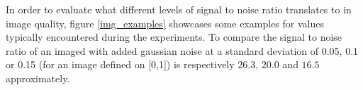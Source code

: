 \documentclass{article}
\begin{document}
In order to evaluate what different levels of signal to noise ratio 
translates to in image quality, figure \ref{img_examples} showcases some 
examples for values typically encountered during the experiments. To 
compare the signal to noise ratio of an imaged with added gaussian noise 
at a standard deviation of 0.05, 0.1 or 0.15  (for an image defined on 
[0,1]) is respectively $26.3, \, 20.0$ and $16.5$ approximately. 

\begin{figure}[h]
\end{figure}
\end{document}
